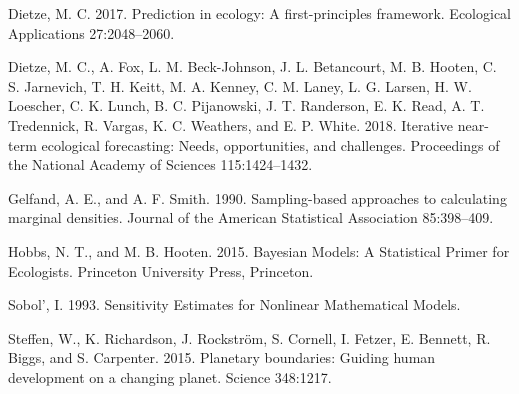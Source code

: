 \documentclass[12pt,]{article}
\begin{document}
\leavevmode\hypertarget{ref-Dietze2017a}{}%
Dietze, M. C. 2017. Prediction in ecology: A first-principles framework.
Ecological Applications 27:2048--2060.

\leavevmode\hypertarget{ref-Dietze2018}{}%
Dietze, M. C., A. Fox, L. M. Beck-Johnson, J. L. Betancourt, M. B.
Hooten, C. S. Jarnevich, T. H. Keitt, M. A. Kenney, C. M. Laney, L. G.
Larsen, H. W. Loescher, C. K. Lunch, B. C. Pijanowski, J. T. Randerson,
E. K. Read, A. T. Tredennick, R. Vargas, K. C. Weathers, and E. P.
White. 2018. Iterative near-term ecological forecasting: Needs,
opportunities, and challenges. Proceedings of the National Academy of
Sciences 115:1424--1432.

\leavevmode\hypertarget{ref-Gelfand1990}{}%
Gelfand, A. E., and A. F. Smith. 1990. Sampling-based approaches to
calculating marginal densities. Journal of the American Statistical
Association 85:398--409.

\leavevmode\hypertarget{ref-Hobbs2015}{}%
Hobbs, N. T., and M. B. Hooten. 2015. Bayesian Models: A Statistical
Primer for Ecologists. Princeton University Press, Princeton.

\leavevmode\hypertarget{ref-Sobol1993}{}%
Sobol', I. 1993. Sensitivity Estimates for Nonlinear Mathematical
Models.

\leavevmode\hypertarget{ref-Steffen2015}{}%
Steffen, W., K. Richardson, J. Rockström, S. Cornell, I. Fetzer, E.
Bennett, R. Biggs, and S. Carpenter. 2015. Planetary boundaries: Guiding
human development on a changing planet. Science 348:1217.
\end{document}
